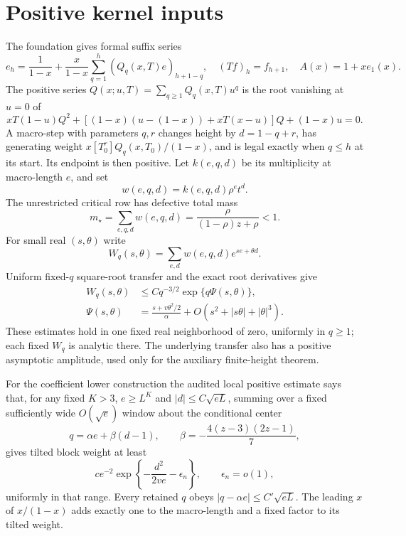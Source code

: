 \documentclass[11pt,letterpaper]{article}
\numberwithin{equation}{section}
\theoremstyle{remark}\newtheorem{remark}[theorem]{Remark}
\newcommand{\st}{\star}
\begin{document}
\section{Positive kernel inputs}
The foundation gives formal suffix series
\begin{equation}\label{a61:o2:eq:walk}
 e_h=\frac1{1-x}+\frac{x}{1-x}\sum_{q=1}^h(Q_q(x,T)e)_{h+1-q},
 \quad (Tf)_h=f_{h+1},\quad A(x)=1+xe_1(x).
\end{equation}
The positive series $Q(x;u,T)=\sum_{q\ge1}Q_q(x,T)u^q$ is the root vanishing at $u=0$ of
\begin{equation}\label{a61:o2:eq:quad}
 xT(1-u)Q^2+[(1-x)(u-(1-x))+xT(x-u)]Q+(1-x)u=0.
\end{equation}
A macro-step with parameters $q,r$ changes height by $d=1-q+r$, has generating weight $x[T_0^r]Q_q(x,T_0)/(1-x)$, and is legal exactly when $q\le h$ at its start. Its endpoint is then positive. Let $k(e,q,d)$ be its multiplicity at macro-length $e$, and set
\[
 w(e,q,d)=k(e,q,d)\rho^e t^d.
\]
The unrestricted critical row has defective total mass
\begin{equation}\label{a61:o2:eq:mass}
 m_\st=\sum_{e,q,d}w(e,q,d)
       =\frac{\rho}{(1-\rho)z+\rho}<1.
\end{equation}
For small real $(s,\theta)$ write
\[
 W_q(s,\theta)=\sum_{e,d}w(e,q,d)e^{se+\theta d}.
\]
Uniform fixed-$q$ square-root transfer and the exact root derivatives give
\begin{align}
 W_q(s,\theta)&\le Cq^{-3/2}\exp\{q\Psi(s,\theta)\},\label{a61:o2:eq:transfer}\\
 \Psi(s,\theta)&=\frac{s+v\theta^2/2}{\alpha}
           +O(s^2+|s\theta|+|\theta|^3).\label{a61:o2:eq:psi}
\end{align}
These estimates hold in one fixed real neighborhood of zero, uniformly in $q\ge1$; each fixed $W_q$ is analytic there. The underlying transfer also has a positive asymptotic amplitude, used only for the auxiliary finite-height theorem.

For the coefficient lower construction the audited local positive estimate says that, for any fixed $K>3$, $e\ge L^K$ and $|d|\le C\sqrt{eL}$, summing over a fixed sufficiently wide $O(\sqrt e)$ window about the conditional center
\[
 q=\alpha e+\beta(d-1),\qquad
 \beta=-\frac{4(z-3)(2z-1)}7,
\]
gives tilted block weight at least
\begin{equation}\label{a61:o2:eq:local-lower}
 c e^{-2}\exp\left\{-\frac{d^2}{2ve}-\epsilon_n\right\},
       \qquad \epsilon_n=o(1),
\end{equation}
uniformly in that range. Every retained $q$ obeys
$|q-\alpha e|\le C'\sqrt{eL}$. The leading $x$ of $x/(1-x)$ adds exactly one to the macro-length and a fixed factor to its tilted weight.
\end{document}
